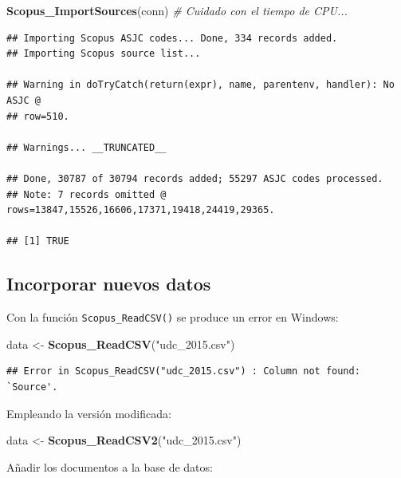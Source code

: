\documentclass[
]{book}
\newenvironment{Shaded}{\begin{snugshade}}{\end{snugshade}}
\newcommand{\CommentTok}[1]{\textcolor[rgb]{0.56,0.35,0.01}{\textit{#1}}}
\newcommand{\KeywordTok}[1]{\textcolor[rgb]{0.13,0.29,0.53}{\textbf{#1}}}
\newcommand{\NormalTok}[1]{#1}
\newcommand{\StringTok}[1]{\textcolor[rgb]{0.31,0.60,0.02}{#1}}
\begin{document}
\begin{Shaded}
\begin{Highlighting}[]
\KeywordTok{Scopus_ImportSources}\NormalTok{(conn) }\CommentTok{# Cuidado con el tiempo de CPU...}
\end{Highlighting}
\end{Shaded}

\begin{verbatim}
## Importing Scopus ASJC codes... Done, 334 records added.
## Importing Scopus source list...

## Warning in doTryCatch(return(expr), name, parentenv, handler): No ASJC @
## row=510.

## Warnings... __TRUNCATED__

## Done, 30787 of 30794 records added; 55297 ASJC codes processed.
## Note: 7 records omitted @ rows=13847,15526,16606,17371,19418,24419,29365.

## [1] TRUE
\end{verbatim}

\hypertarget{incorporar-nuevos-datos}{%
\subsection{Incorporar nuevos datos}\label{incorporar-nuevos-datos}}

Con la función \texttt{Scopus\_ReadCSV()} se produce un error en Windows:

\begin{Shaded}
\begin{Highlighting}[]
\NormalTok{data <-}\StringTok{  }\KeywordTok{Scopus_ReadCSV}\NormalTok{(}\StringTok{"udc_2015.csv"}\NormalTok{)}
\end{Highlighting}
\end{Shaded}

\begin{verbatim}
## Error in Scopus_ReadCSV("udc_2015.csv") : Column not found: `Source'.
\end{verbatim}

Empleando la versión modificada:

\begin{Shaded}
\begin{Highlighting}[]
\NormalTok{data <-}\StringTok{  }\KeywordTok{Scopus_ReadCSV2}\NormalTok{(}\StringTok{"udc_2015.csv"}\NormalTok{)}
\end{Highlighting}
\end{Shaded}

Añadir los documentos a la base de datos:
\end{document}

